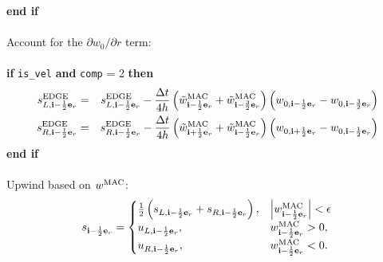 {\bf end if}\\ \\
Account for the $\partial w_0/\partial r$ term:\\ \\
{\bf if} {\tt is\_vel} {\bf and} {\tt comp} = 2 {\bf then}
\begin{eqnarray}
s_{L,{\bf i}-\frac{1}{2}{\bf e}_r}^{\rm EDGE} &=& s_{L,{\bf i}-\frac{1}{2}{\bf e}_r}^{\rm EDGE} - 
\frac{\Delta t}{4h}\left(\tilde{w}^{\rm MAC}_{{\bf i}-\frac{1}{2}{\bf e}_r} + \tilde{w}^{\rm MAC}_{{\bf i}-\frac{3}{2}{\bf e}_r}\right)\left(w_{0,{\bf i}-\frac{1}{2}{\bf e}_r}-w_{0,{\bf i}-\frac{3}{2}{\bf e}_r}\right) \\
s_{R,{\bf i}-\frac{1}{2}{\bf e}_r}^{\rm EDGE} &=& s_{R,{\bf i}-\frac{1}{2}{\bf e}_r}^{\rm EDGE} -
\frac{\Delta t}{4h}\left(\tilde{w}^{\rm MAC}_{{\bf i}+\frac{1}{2}{\bf e}_r} + \tilde{w}^{\rm MAC}_{{\bf i}-\frac{1}{2}{\bf e}_r}\right)\left(w_{0,{\bf i}+\frac{1}{2}{\bf e}_r}-w_{0,{\bf i}-\frac{1}{2}{\bf e}_r}\right) \\
\end{eqnarray}
{\bf end if}\\ \\
Upwind based on $w^{\rm MAC}$:
\begin{equation}
s_{{\bf i}-\frac{1}{2}{\bf e}_r} =
\begin{cases}
\frac{1}{2}\left(s_{L,{\bf i}-\frac{1}{2}{\bf e}_r} + s_{R,{\bf i}-\frac{1}{2}{\bf e}_r}\right), & \left|w^{\rm MAC}_{{\bf i}-\frac{1}{2}{\bf e}_r}\right| < \epsilon \\
u_{L,{\bf i}-\frac{1}{2}{\bf e}_r}, & w^{\rm MAC}_{{\bf i}-\frac{1}{2}{\bf e}_r} > 0, \\
u_{R,{\bf i}-\frac{1}{2}{\bf e}_r}, & w^{\rm MAC}_{{\bf i}-\frac{1}{2}{\bf e}_r} < 0. \\
\end{cases}
\end{equation}

\newpage

